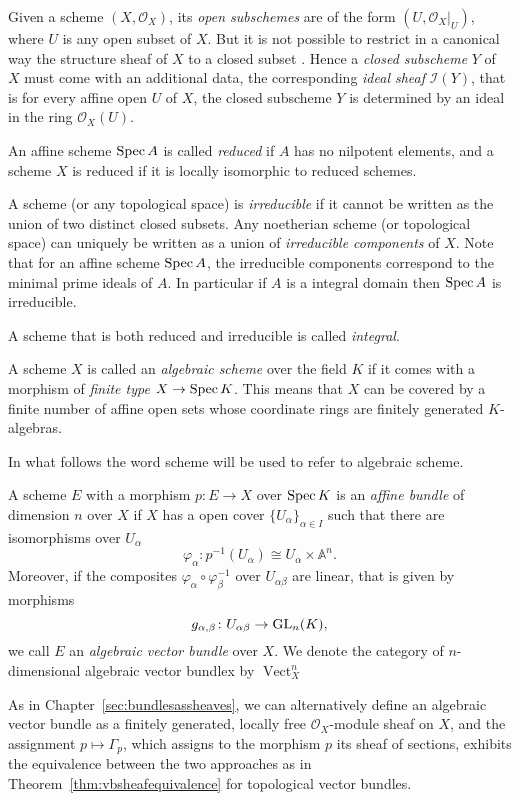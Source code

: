 \documentclass[a4paper,openany]{scrbook}
\DeclareMathOperator{\Vect}{Vect}
\newcommand{\Reg}[1]{\mathcal O_{#1}}
\begin{document}
Given a scheme $(X,\mathcal O_X)$, its \emph{open subschemes} are of the form $(U,\mathcal O_X|_U)$, where $U$ is any open subset of $X$. But it is not possible to restrict in a canonical way the structure sheaf of $X$ to a closed subset . Hence a \emph{closed subscheme} $Y$ of $X$ must come with an additional data, the corresponding \emph{ideal sheaf} $\mathcal I(Y)$, that is for every affine open $U$ of $X$, the closed subscheme $Y$ is determined by an ideal in the ring $\mathcal O_X(U)$.

An affine scheme $\operatorname{Spec} A$ is called \emph{reduced} if $A$ has no nilpotent elements, and a scheme $X$ is reduced if it is locally isomorphic to reduced schemes.

A scheme (or any topological space) is \emph{irreducible} if it cannot be written as the union of two distinct closed subsets. Any noetherian scheme (or topological space) can uniquely be written as a union of \emph{irreducible components} of $X$. Note that for an affine scheme $\operatorname{Spec} A$, the irreducible components correspond to the minimal prime ideals of $A$. In particular if $A$ is a integral domain then $\operatorname{Spec} A$ is irreducible.

A scheme that is both reduced and irreducible is called \emph{integral}.

A scheme $X$ is called an \emph{algebraic scheme} over the field $K$ if it comes with a morphism of \emph{finite type} $X \to \operatorname{Spec} K$. This means that $X$ can be covered by a finite number of affine open sets whose coordinate rings are finitely generated $K$-algebras.

In what follows the word scheme will be used to refer to algebraic scheme.

\begin{defn}
 A scheme $E$ with a morphism $p\colon E\to X$ over $\operatorname{Spec} K$ is an \emph{affine bundle} of dimension $n$ over $X$ if $X$ has a open cover $\{U_\alpha\}_{\alpha \in I}$ such that there are isomorphisms over $U_\alpha$
 \[\varphi_\alpha\colon p^{-1}(U_\alpha) \cong U_\alpha\times \mathbb A^n.\]
 Moreover, if  the composites $\varphi_\alpha\circ \varphi_\beta^{-1}$ over $U_{\alpha\beta}$ are linear, that is given by morphisms
 \[
 g_{\alpha,\beta}\colon U_{\alpha\beta} \to \operatorname{GL}_n(K),
 \]
 we call $E$ an \emph{algebraic vector bundle} over $X$. We denote the category of $n$-dimensional algebraic vector bundlex by $\Vect^n_X$
\end{defn}

As in Chapter~\ref{sec:bundlesassheaves}, we can alternatively define an algebraic vector bundle as a finitely generated, locally free $\Reg{X}$-module sheaf on $X$, and the assignment $p \mapsto \Gamma_p$, which assigns to the morphism $p$ its sheaf of sections, exhibits the equivalence between the two approaches as in Theorem~\ref{thm:vbsheafequivalence} for topological vector bundles. 
\end{document}
